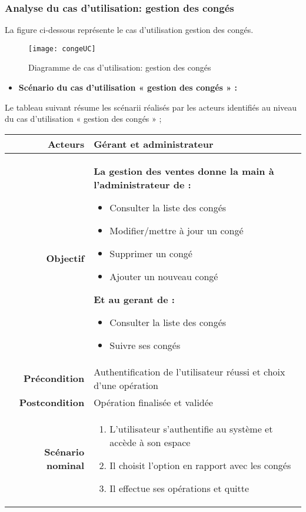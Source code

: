 \documentclass[a4paper,11pt]{article}
\begin{document}
\subsubsection{Analyse du cas d'utilisation: gestion des congés}
La figure ci-dessous représente le cas d'utilisation gestion des congés.
\newpage
\begin{figure}[ht]
\texttt{[image: congeUC]}
\caption{Diagramme de cas d'utilisation: gestion des congés} 
\end{figure}
\begin{itemize}
  \item \textbf{Scénario du cas d’utilisation « gestion des congés » :} 
\end{itemize}
Le tableau suivant résume les scénarii réalisés par les acteurs identifiés au niveau du cas d’utilisation « gestion des congés » ;
\newline
\newline
\begin{tabular}{|r|l|} \hline
\textbf{Acteurs} & Gérant et administrateur\\ \hline
\textbf{Objectif} & \begin{minipage}{0.95\textwidth}
  \textbf{La gestion des ventes donne la main à l'administrateur de :}
  \begin{itemize}
    \item Consulter la liste des congés
    \item Modifier/mettre à jour un congé
    \item Supprimer un congé
    \item Ajouter un nouveau congé
  \end{itemize}
  \textbf{Et au gerant de :}
  \begin{itemize}
    \item Consulter la liste des congés
    \item Suivre ses congés 
  \end{itemize}
\end{minipage} \\ \hline
\textbf{Précondition} & Authentification de l'utilisateur réussi et choix d'une opération \\ \hline
\textbf{Postcondition} & Opération finalisée et validée \\ \hline
\textbf{Scénario nominal} & \begin{minipage}{0.95\textwidth}
  \begin{enumerate}
    \item L'utilisateur s'authentifie au système et accède à son espace
    \item Il choisit l'option en rapport avec les congés
    \item Il effectue ses opérations et quitte
\end{enumerate}
\end{minipage} \\ \hline
\end{tabular}
\end{document}
